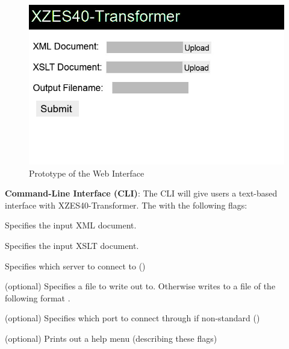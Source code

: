 \begin{description}
{        \begin{figure}[h]
        \caption{Prototype of the Web Interface}
        \centering
        \includegraphics{figures/website-mockup.jpg}
        \end{figure}
    }
    \item {
        \textbf{Command-Line Interface (CLI)}:
        The CLI will give users a text-based interface with XZES40-Transformer.
        The with the following flags:
        \begin{description}
            \item {
              \textbf{}
              Specifies the input XML document.
            }
            \item {
              \textbf{}
              Specifies the input XSLT document.
            }
            \item {
              \textbf{}
              Specifies which server to connect to ()
            }
            \item {
              \textbf{} (optional)
              Specifies a file to write out to.  Otherwise writes to a file of the following format .
            }
            \item {
              \textbf{} (optional)
              Specifies which port to connect through if non-standard ()
            }
            \item {
              \textbf{} (optional)
              Prints out a help menu (describing these flags)
            }
        \end{description}

}
\end{description}

